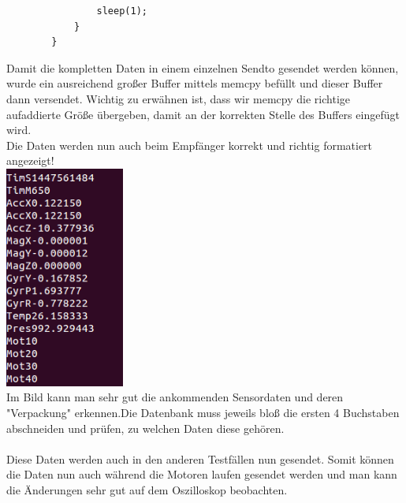 \documentclass{article}
\begin{document}
\begin{enumerate}
\begin{verbatim}
                sleep(1);
            }
        }
\end{verbatim}

Damit die kompletten Daten in einem einzelnen Sendto gesendet werden können, wurde ein ausreichend großer Buffer mittels memcpy befüllt und dieser Buffer dann versendet. Wichtig zu erwähnen ist, dass wir memcpy die richtige aufaddierte Größe übergeben, damit an der korrekten Stelle des Buffers eingefügt wird.\\
Die Daten werden nun auch beim Empfänger korrekt und richtig formatiert angezeigt!\\
\includegraphics[height=7.3cm]{graphics/sensor.png}\\

Im Bild kann man sehr gut die ankommenden Sensordaten und deren "Verpackung" erkennen.Die Datenbank muss jeweils bloß die ersten 4 Buchstaben abschneiden und prüfen, zu welchen Daten diese gehören.\\
\\

Diese Daten werden auch in den anderen Testfällen nun gesendet. Somit können die Daten nun auch während die Motoren laufen gesendet werden und man kann die Änderungen sehr gut auf dem Oszilloskop beobachten.\\

\end{enumerate}
\end{document}
